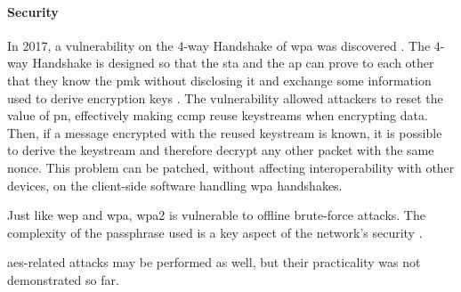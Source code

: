 \paragraph{Security}

In 2017, a vulnerability on the 4-way Handshake of \gls{wpa} was discovered \cite{krack}. The 4-way Handshake is designed so that the \gls{sta} and the \gls{ap} can prove to each other that they know the \gls{pmk} without disclosing it and exchange some information used to derive encryption keys \cite{ieee_80211_2020}. The vulnerability allowed attackers to reset the value of \gls{pn}, effectively making \gls{ccmp} reuse keystreams when encrypting data. Then, if a message encrypted with the reused keystream is known, it is possible to derive the keystream and therefore decrypt any other packet with the same nonce. This problem can be patched, without affecting interoperability with other devices, on the client-side software handling \gls{wpa} handshakes.

Just like \gls{wep} and \gls{wpa}, \gls{wpa}2 is vulnerable to offline brute-force attacks. The complexity of the passphrase used is a key aspect of the network’s security \cite{wifi_state}.

\gls{aes}-related attacks may be performed as well, but their practicality was not demonstrated so far.
